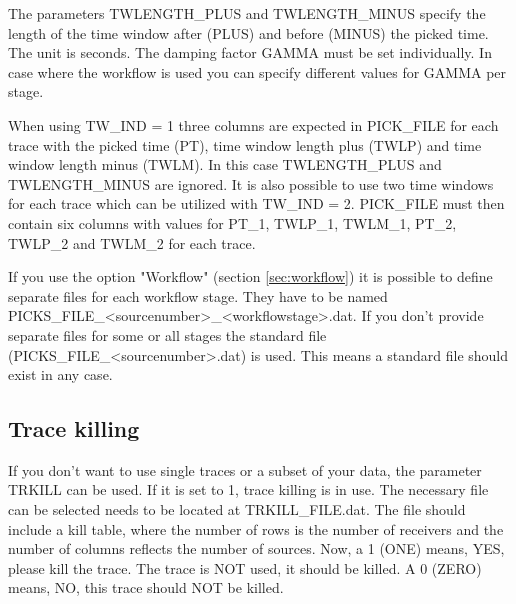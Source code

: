 The parameters TWLENGTH\_PLUS and TWLENGTH\_MINUS specify the length of the time window after (PLUS) and before (MINUS) the picked time. The unit is seconds. The damping factor GAMMA must be set individually. In case where the workflow is used you can specify different values for GAMMA per stage.

When using TW\_IND = 1 three columns are expected in PICK\_FILE for each trace with the picked time (PT), time window length plus (TWLP) and time window length minus (TWLM). In this case TWLENGTH\_PLUS and TWLENGTH\_MINUS are ignored. It is also possible to use two time windows for each trace which can be utilized with TW\_IND = 2. PICK\_FILE must then contain six columns with values for PT\_1, TWLP\_1, TWLM\_1, PT\_2, TWLP\_2 and TWLM\_2 for each trace.

If you use the option "Workflow" (section \ref{sec:workflow}) it is possible to define separate files for each workflow stage. They have to be named PICKS\_FILE\_<sourcenumber>\_<workflowstage>.dat. If you don't provide separate files for some or all stages the standard file (PICKS\_FILE\_<sourcenumber>.dat) is used. This means a standard file should exist in any case.

\subsection{Trace killing}
\label{sec:trace_killing}
{\color{blue}{\begin{verbatim}
"Trace killing" : "comment",
			"TRKILL" : "0",
			"TRKILL_FILE" : "./trace_kill/trace_kill",
			
			"TRKILL_OFFSET" : "0",
			"TRKILL_OFFSET_LOWER" : "20",
			"TRKILL_OFFSET_UPPER" : "100",
\end{verbatim}}}

{\color{red}{\begin{verbatim}
Default values are:
	TRKILL=0
\end{verbatim}}}

If you don't want to use single traces or a subset of your data, the parameter TRKILL can be used. If it is set to 1, trace killing is in use. The necessary file can be selected needs to be located at TRKILL\_FILE.dat. The file should include a kill table, where the number of rows is the number of receivers and the number of columns reflects the number of sources. Now, a 1 (ONE) means, YES, please kill the trace. The trace is NOT used, it should be killed. A 0 (ZERO) means, NO, this trace should NOT be killed. 

